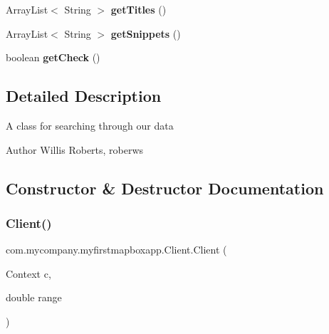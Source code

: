 \begin{DoxyCompactItemize}
\item 
\mbox{\label{classcom_1_1mycompany_1_1myfirstmapboxapp_1_1_client_ad5790c284f8c5b3be226ff44639ebe8b}} 
Array\+List$<$ String $>$ {\bfseries get\+Titles} ()
\item 
\mbox{\label{classcom_1_1mycompany_1_1myfirstmapboxapp_1_1_client_a74ad0447a9fda0b6270fa5604b943f65}} 
Array\+List$<$ String $>$ {\bfseries get\+Snippets} ()
\item 
\mbox{\label{classcom_1_1mycompany_1_1myfirstmapboxapp_1_1_client_a864a160c81aac3dd2c4b1194525f5b2b}} 
boolean {\bfseries get\+Check} ()
\end{DoxyCompactItemize}


\subsection{Detailed Description}
A class for searching through our data \begin{DoxyAuthor}{Author}
Willis Roberts, roberws 
\end{DoxyAuthor}


\subsection{Constructor \& Destructor Documentation}
\mbox{\label{classcom_1_1mycompany_1_1myfirstmapboxapp_1_1_client_a89ac331e3bb40c52719d2010266b85f0}} 
\subsubsection{\texorpdfstring{Client()}{Client()}}
{\footnotesize\ttfamily com.\+mycompany.\+myfirstmapboxapp.\+Client.\+Client (\begin{DoxyParamCaption}\item[{Context}]{c,  }\item[{double}]{range }\end{DoxyParamCaption})\hspace{0.3cm}{\ttfamily [inline]}}

